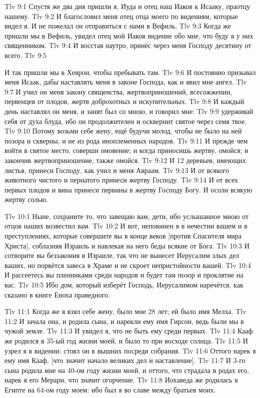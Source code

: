\vs Tlv 9:1
Спустя же два дня пришли я, Иуда и отец наш Иаков к Исааку, праотцу нашему.
\vs Tlv 9:2
И благословил меня отец отца моего по видениям, которые видел я.
И не пожелал он отправиться с нами в Вефиль.
\vs Tlv 9:3
Когда же пришли мы в Вефиль, увидел отец мой Иаков видение обо мне,
что буду я у них священником.
\vs Tlv 9:4
И восстав наутро, принёс через меня Господу десятину от всего.
\vs Tlv 9:5

И так пришли мы в Хеврон, чтобы пребывать там.
\vs Tlv 9:6
И постоянно призывал меня Исаак, дабы наставлять меня в законе Господа, как и
явил мне ангел.
\vs Tlv 9:7
И учил он меня закону священства, жертвоприношений, всесожжении,
первенцев от плодов, жертв доброхотных и искупительных.
\vs Tlv 9:8
И каждый день наставлял он меня, и занят был со мною, и говорил мне:
\vs Tlv 9:9
удерживай себя от духа блуда, ибо он продолжителен и осквернит
святое через семя твое.
\vs Tlv 9:10
Потому возьми себе жену, ещё будучи молод,
чтобы не было на ней позора и скверны,
и не из рода иноплеменных народов.
\vs Tlv 9:11
И прежде чем войти в святое место, соверши омовение;
и когда приносишь жертву, омойся;
и закончив жертвоприношение, также омойся.
\vs Tlv 9:12
И 12 деревьев, имеющих листья, принеси Господу,
как учил и меня Авраам.
\vs Tlv 9:13
И от всякого животного чистого и пернатого принеси жертву Господу.
\vs Tlv 9:14
И от всех первых плодов и вина принеси первины в жертву Господу Богу.
И осоли всякую жертву солью.

\vs Tlv 10:1
Ныне, сохраните то, что завещаю вам, дети,
ибо услышанное мною от отцов наших возвестил вам.
\vs Tlv 10:2
И вот, неповинен я в нечестии вашем и в преступлениях,
которые совершите вы в конце веков [против Спасителя мира Христа],
соблазняя Израиль и навлекая на него беды всякие от Бога.
\vs Tlv 10:3
И сотворите вы беззакония в Израиле, так что не вынесет
Иерусалим злых дел ваших,
но порвётся завеса в Храме и не скроет непристойности вашей.
\vs Tlv 10:4
И рассеетесь вы пленниками среди народов и будет
там позор и проклятие на вас.
\vs Tlv 10:5
Ибо дом, который изберёт Господь,
Иерусалимом наречётся, как сказано в книге Еноха праведного.

\vs Tlv 11:1
Когда же я взял себе жену, было мне 28 лет;
ей было имя Мелха. 
\vs Tlv 11:2
И зачала она, и родила сына, и нарекли ему имя Гирсон,
ведь были мы в чужой земле.
\vs Tlv 11:3
И увидел я, что не быть ему среди первых.
\vs Tlv 11:4
Кааф же родился в 35-ый год жизни моей,
и было то при восходе солнца.
\vs Tlv 11:5
И узрел я в видении:
стоял он в вышних посреди собрания.
\vs Tlv 11:6
Оттого нарек я ему имя Кааф,
[что значит начало великих дел и наставление].
\vs Tlv 11:7
И 3-го сына родила мне на 40-ом году жизни моей, и оттого,
что страдала в родах его, нарек я его Мерари, что значит огорчение.
\vs Tlv 11:8
Иохаведа же родилась в Египте на 64-ом году моем:
ибо был я во славе между братьев моих.

